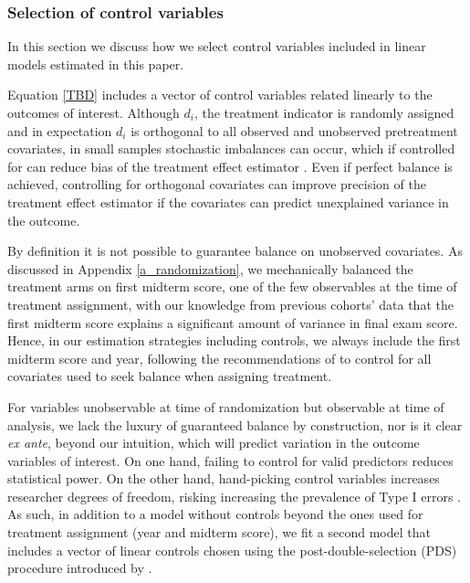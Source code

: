 \documentclass[12pt]{article}
\begin{document}
\subsubsection{Selection of control variables} \label{a_selection}

In this section we discuss how we select control variables included in linear models estimated in this paper.

Equation \ref{TBD} includes a vector of control variables related linearly to the outcomes of interest. Although $d_i$, the treatment indicator is randomly assigned and in expectation $d_i$ is orthogonal to all observed and unobserved pretreatment covariates, in small samples stochastic imbalances can occur, which if controlled for can reduce bias of the treatment effect estimator \parencite{ai2017}. Even if perfect balance is achieved, controlling for orthogonal covariates can improve precision of the treatment effect estimator if the covariates can predict unexplained variance in the outcome.

By definition it is not possible to guarantee balance on unobserved covariates. As discussed in Appendix \ref{a_randomization}, we mechanically balanced the treatment arms on first midterm score, one of the few observables at the time of treatment assignment, with our knowledge from previous cohorts' data that the first midterm score explains a significant amount of variance in final exam score. Hence, in our estimation strategies including controls, we always include the first midterm score and year, following the recommendations of \textcite{bm2009} to control for all covariates used to seek balance when assigning treatment.

For variables unobservable at time of randomization but observable at time of analysis, we lack the luxury of guaranteed balance by construction, nor is it clear \textit{ex ante}, beyond our intuition, which will predict variation in the outcome variables of interest. On one hand, failing to control for valid predictors reduces statistical power. On the other hand, hand-picking control variables increases researcher degrees of freedom, risking increasing the prevalence of Type I errors \parencite{sns2011}. As such, in addition to a model without controls beyond the ones used for treatment assignment (year and midterm score), we fit a second model that includes a vector of linear controls chosen using the post-double-selection (PDS) procedure introduced by \textcite{bch2014a}.
\end{document}
